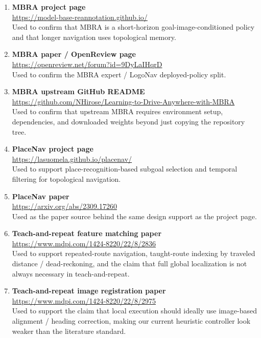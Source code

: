 \documentclass[11pt,a4paper]{article}
\begin{document}
\begin{enumerate}[nosep]
  \item \textbf{MBRA project page} \\
  \url{https://model-base-reannotation.github.io/} \\
  Used to confirm that MBRA is a short-horizon goal-image-conditioned policy and
  that longer navigation uses topological memory.

  \item \textbf{MBRA paper / OpenReview page} \\
  \url{https://openreview.net/forum?id=9DyLaIHqrD} \\
  Used to confirm the MBRA expert / LogoNav deployed-policy split.

  \item \textbf{MBRA upstream GitHub README} \\
  \url{https://github.com/NHirose/Learning-to-Drive-Anywhere-with-MBRA} \\
  Used to confirm that upstream MBRA requires environment setup, dependencies,
  and downloaded weights beyond just copying the repository tree.

  \item \textbf{PlaceNav project page} \\
  \url{https://lasuomela.github.io/placenav/} \\
  Used to support place-recognition-based subgoal selection and temporal
  filtering for topological navigation.

  \item \textbf{PlaceNav paper} \\
  \url{https://arxiv.org/abs/2309.17260} \\
  Used as the paper source behind the same design support as the project page.

  \item \textbf{Teach-and-repeat feature matching paper} \\
  \url{https://www.mdpi.com/1424-8220/22/8/2836} \\
  Used to support repeated-route navigation, taught-route indexing by traveled
  distance / dead-reckoning, and the claim that full global localization is not
  always necessary in teach-and-repeat.

  \item \textbf{Teach-and-repeat image registration paper} \\
  \url{https://www.mdpi.com/1424-8220/22/8/2975} \\
  Used to support the claim that local execution should ideally use image-based
  alignment / heading correction, making our current heuristic controller look
  weaker than the literature standard.


\end{enumerate}
\end{document}
